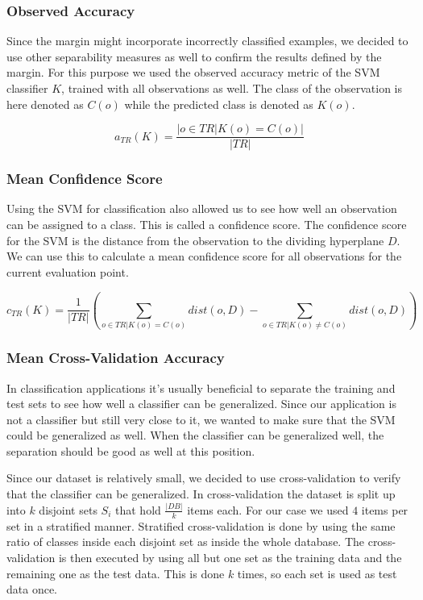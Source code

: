 \documentclass[pdftex,12pt,a4paper]{report}
\begin{document}
\subsubsection{Observed Accuracy}

Since the margin might incorporate incorrectly classified examples, we decided to use other separability measures
as well to confirm the results defined by the margin. For this purpose we used the observed accuracy metric of the SVM classifier $K$, trained with all observations as well. The class of the observation is here denoted as $C(o)$
while the predicted class is denoted as $K(o)$.

\begin{equation}
a_{TR}(K) = \frac{|o \in TR | K(o) = C(o)|}{|TR|}
\end{equation}

\subsubsection{Mean Confidence Score}

Using the SVM for classification also allowed us to see how well an observation can be assigned to a class. This
is called a confidence score. The confidence score for the SVM is the distance from the observation to the dividing
hyperplane $D$. We can use this to calculate a mean confidence score for all observations for the current evaluation point.

\begin{equation}
c_{TR}(K) = \frac{1}{|TR|} (\sum_{o \in TR | K(o) = C(o)} dist(o, D) - \sum_{o \in TR | K(o) \neq C(o)} dist(o, D))
\end{equation}

\subsubsection{Mean Cross-Validation Accuracy}
\label{subsub:cross-validation-accuracy}

In classification applications it's usually beneficial to separate the training and test sets to see how well a
classifier can be generalized. Since our application is not a classifier but still very close to it, we wanted
to make sure that the SVM could be generalized as well. When the classifier can be generalized well, the separation
should be good as well at this position.

Since our dataset is relatively small, we decided to use cross-validation to verify that the classifier can be
generalized. In cross-validation the dataset is split up into $k$ disjoint sets $S_i$ that hold $\frac{|DB|}{k}$ items each. For our case we used $4$ items per set in a stratified manner. Stratified cross-validation is done by using the same ratio of classes inside each disjoint set as inside the whole database. The cross-validation is then
executed by using all but one set as the training data and the remaining one as the test data. This is done $k$ times, so each set is used as test data once.
\end{document}
